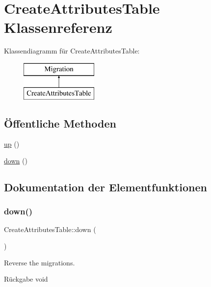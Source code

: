 \hypertarget{classCreateAttributesTable}{}\section{Create\+Attributes\+Table Klassenreferenz}
\label{classCreateAttributesTable}
Klassendiagramm für Create\+Attributes\+Table\+:\begin{figure}[H]
\begin{center}
\leavevmode
\includegraphics[height=2.000000cm]{de/d05/classCreateAttributesTable}
\end{center}
\end{figure}
\subsection*{Öffentliche Methoden}
\begin{DoxyCompactItemize}
\item 
\hyperlink{classCreateAttributesTable_a61c7627704f6d52eecb70da930a284ec}{up} ()
\item 
\hyperlink{classCreateAttributesTable_acdfb3766dd315c3cceef890298a1af6a}{down} ()
\end{DoxyCompactItemize}


\subsection{Dokumentation der Elementfunktionen}
\mbox{\label{classCreateAttributesTable_acdfb3766dd315c3cceef890298a1af6a}} 
\subsubsection{\texorpdfstring{down()}{down()}}
{\footnotesize\ttfamily Create\+Attributes\+Table\+::down (\begin{DoxyParamCaption}{ }\end{DoxyParamCaption})}

Reverse the migrations.

\begin{DoxyReturn}{Rückgabe}
void 
\end{DoxyReturn}
\mbox{\label{classCreateAttributesTable_a61c7627704f6d52eecb70da930a284ec}} 
